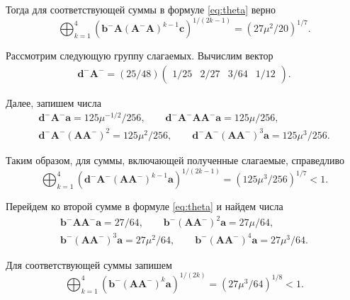 \documentclass[specialist,
               substylefile = spbu.rtx,
               subf,href,colorlinks=true, 12pt]{disser}
\theoremstyle{definition}
\begin{document}
Тогда для соответствующей суммы в формуле \eqref{eq:theta} верно
\begin{equation*}
\bigoplus_{k=1}^{4}
\left(
\bm{b}^{-}\bm{A}(\bm{A}^{-}\bm{A})^{k-1}\bm{c}
\right)^{1/(2k-1)}
=
(27\mu^{2}/20)^{1/7}.
\end{equation*}
 
Рассмотрим следующую группу слагаемых. Вычислим вектор
\begin{gather*}
\bm{d}^{-}\bm{A}^{-}
=
(25/48)
\begin{pmatrix}
1/25 &2/27 &3/64 &1/12
\end{pmatrix}.
\end{gather*}

Далее, запишем числа
\begin{gather*}
\bm{d}^{-}\bm{A}^{-}\bm{a}
=125\mu^{-1/2}/256,
\qquad
\bm{d}^{-}\bm{A}^{-}\bm{A}\bm{A}^{-}\bm{a}
=
125\mu/256,
\\
\bm{d}^{-}\bm{A}^{-}(\bm{A}\bm{A}^{-})^{2}
=
125\mu^2/256,
\qquad
\bm{d}^{-}\bm{A}^{-}(\bm{A}\bm{A}^{-})^{3}\bm{a}
=
125\mu^3/256.
\end{gather*}
 
Таким образом, для суммы, включающей полученные слагаемые, справедливо
\begin{equation*}
\bigoplus_{k=1}^{4}
\left(\bm{d}^{-}\bm{A}^{-}(\bm{A}\bm{A}^{-})^{k-1}\bm{a}
\right)^{1/(2k-1)}
=
(125\mu^3/256)^{1/7}
<1.
\end{equation*}

Перейдем ко второй сумме в формуле \eqref{eq:theta} и найдем числа
\begin{gather*}
\bm{b}^{-}\bm{A}\bm{A}^{-}\bm{a}
=
27/64,
\qquad
\bm{b}^{-}(\bm{A}\bm{A}^{-})^{2}\bm{a}
=
27\mu/64,
\\
\bm{b}^{-}(\bm{A}\bm{A}^{-})^{3}\bm{a}
=
27\mu^{2}/64,
\qquad
\bm{b}^{-}(\bm{A}\bm{A}^{-})^{4}\bm{a}
=27\mu^{3}/64.
\end{gather*}

Для соответствующей суммы запишем
\begin{equation*}
\bigoplus_{k=1}^{4}
\left(
\bm{b}^{-}(\bm{A}\bm{A}^{-})^{k}\bm{a}
\right)^{1/(2k)}
=
(27\mu^{3}/64)^{1/8}
<1.
\end{equation*}
\end{document}
